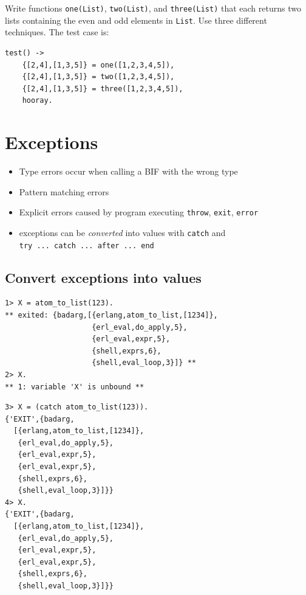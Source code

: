 \documentclass[12pt]{article}
\begin{document}
Write functions \verb+one(List)+, \verb+two(List)+, and
\verb+three(List)+ that each returns two lists containing the even and
odd elements in \verb+List+. Use three different techniques.  The test
case is:

\begin{verbatim}
test() ->
    {[2,4],[1,3,5]} = one([1,2,3,4,5]),
    {[2,4],[1,3,5]} = two([1,2,3,4,5]),
    {[2,4],[1,3,5]} = three([1,2,3,4,5]),
    hooray.
\end{verbatim}

\section{Exceptions}

\begin{itemize}
\item Type errors occur when calling a BIF with the wrong type
\item Pattern matching errors
\item Explicit errors caused by program executing \verb+throw+,
  \verb+exit+, \verb+error+
\item exceptions can be {\sl converted} into values with
\verb+catch+  and\\
\verb+try ... catch ... after ... end+
\end{itemize}

\subsection{Convert exceptions into values}

\begin{verbatim}
1> X = atom_to_list(123).
** exited: {badarg,[{erlang,atom_to_list,[1234]},
                    {erl_eval,do_apply,5},
                    {erl_eval,expr,5},
                    {shell,exprs,6},
                    {shell,eval_loop,3}]} **
2> X.
** 1: variable 'X' is unbound **
\end{verbatim}

\begin{verbatim}
3> X = (catch atom_to_list(123)).
{'EXIT',{badarg,
  [{erlang,atom_to_list,[1234]},
   {erl_eval,do_apply,5},
   {erl_eval,expr,5},
   {erl_eval,expr,5},
   {shell,exprs,6},
   {shell,eval_loop,3}]}}
4> X.
{'EXIT',{badarg,
  [{erlang,atom_to_list,[1234]},
   {erl_eval,do_apply,5},
   {erl_eval,expr,5},
   {erl_eval,expr,5},
   {shell,exprs,6},
   {shell,eval_loop,3}]}}
\end{verbatim}
\end{document}
